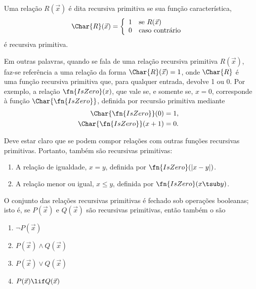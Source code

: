 \documentclass[../../../include/open-logic-section]{subfiles}
\begin{document}


\begin{defn}
Uma relação $R(\vec x)$ é dita recursiva primitiva se sua função
característica,
\[
\Char{R}(\vec x) = \left\{
  \begin{array}{ll}
  1 & \mbox{se $R(\vec x)$} \\
  0 & \mbox{caso contrário}
  \end{array}
\right.
\]
é recursiva primitiva.
\end{defn}

Em outras palavras, quando se fala de uma relação recursiva primitiva
$R(\vec x)$, faz-se referência a uma relação da forma
$\Char{R}(\vec x) = 1$, onde $\Char{R}$ é uma função recursiva primitiva que,
para qualquer entrada, devolve 1 ou 0. Por exemplo, a relação
$\fn{IsZero}(x)$, que vale se, e somente se, $x = 0$, corresponde à função
$\Char{\fn{IsZero}}$, definida por recursão primitiva mediante
\begin{align*}
\Char{\fn{IsZero}}(0) & = 1,\\
\Char{\fn{IsZero}}(x+1) & = 0.
\end{align*}

Deve estar claro que se podem compor relações com outras funções recursivas
primitivas. Portanto, também são recursivas primitivas:
\begin{enumerate}
\item A relação de igualdade, $x = y$, definida por
  $\fn{IsZero}(\left|x-y\right|)$.
\item A relação menor ou igual, $x \leq y$, definida por
  $\fn{IsZero}(x \tsub y)$.
\end{enumerate}


\begin{prop}
  O conjunto das relações recursivas primitivas é fechado sob operações
  booleanas; isto é, se $P(\vec x)$ e $Q(\vec x)$ são recursivas primitivas,
  então também o são
  \begin{enumerate}
  \item $\lnot P(\vec x)$
  \item $P(\vec x) \land Q(\vec x)$
  \item $P(\vec x) \lor Q(\vec x)$
  \item $P(\vec x) \lif Q(\vec x)$
  \end{enumerate}
\end{prop}
\end{document}
